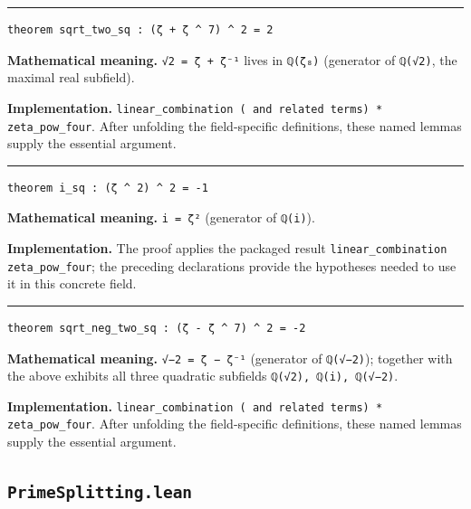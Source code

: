 \documentclass[UTF8,a4paper,11pt,fontset=fandol]{ctexart}
\theoremstyle{definition}
\newcommand{\statementsep}{\par\medskip\hrule\medskip}
\begin{document}
\statementsep
\begin{verbatim}
theorem sqrt_two_sq : (ζ + ζ ^ 7) ^ 2 = 2
\end{verbatim}
\noindent\textbf{Mathematical meaning.} \texttt{√2 = ζ + ζ⁻¹} lives in \texttt{ℚ(ζ₈)} (generator of \texttt{ℚ(√2)}, the maximal real subfield).\par
\noindent\textbf{Implementation.} \texttt{linear\_\allowbreak{}combination ( and related terms) * zeta\_\allowbreak{}pow\_\allowbreak{}four}. After unfolding the field-specific definitions, these named lemmas supply the essential argument.\par
\statementsep
\begin{verbatim}
theorem i_sq : (ζ ^ 2) ^ 2 = -1
\end{verbatim}
\noindent\textbf{Mathematical meaning.} \texttt{i = ζ²} (generator of \texttt{ℚ(i)}).\par
\noindent\textbf{Implementation.} The proof applies the packaged result \texttt{linear\_\allowbreak{}combination zeta\_\allowbreak{}pow\_\allowbreak{}four}; the preceding declarations provide the hypotheses needed to use it in this concrete field.\par
\statementsep
\begin{verbatim}
theorem sqrt_neg_two_sq : (ζ - ζ ^ 7) ^ 2 = -2
\end{verbatim}
\noindent\textbf{Mathematical meaning.} \texttt{√−2 = ζ − ζ⁻¹} (generator of \texttt{ℚ(√−2)}); together with the above exhibits all three quadratic subfields \texttt{ℚ(√2), ℚ(i), ℚ(√−2)}.\par
\noindent\textbf{Implementation.} \texttt{linear\_\allowbreak{}combination ( and related terms) * zeta\_\allowbreak{}pow\_\allowbreak{}four}. After unfolding the field-specific definitions, these named lemmas supply the essential argument.\par

\subsection{\texttt{PrimeSplitting.lean}}
\end{document}

